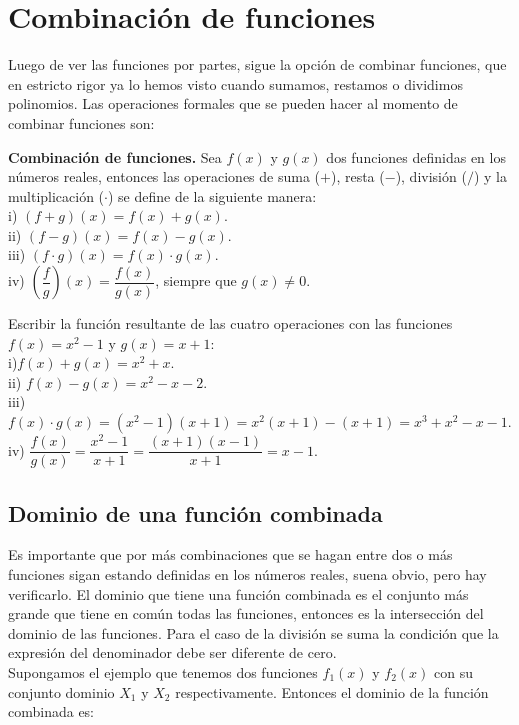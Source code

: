 \section{Combinación de funciones}
Luego de ver las funciones por partes, sigue la opción de combinar funciones, que en estricto rigor ya lo hemos visto cuando sumamos, restamos o dividimos polinomios. Las operaciones formales que se pueden hacer al momento de combinar funciones son: \\
\begin{mydef}
\textbf{Combinación de funciones.} Sea $f(x)$ y $g(x)$ dos funciones definidas en los números reales, entonces las operaciones de suma ($+$), resta ($-$), división ($\slash$) y la multiplicación ($\cdot$) se define de la siguiente manera:\\

\noindent i) $(f+g)(x)=f(x)+g(x)$.\\
\noindent ii) $(f-g)(x)=f(x)-g(x)$.\\
\noindent iii) $(f\cdot g)(x)=f(x)\cdot g(x)$.\\
\noindent iv) $\left(\dfrac{f}{g} \right)(x)=\dfrac{f(x)}{g(x)}$, siempre que $g(x)\neq 0$.\\
\end{mydef}

\begin{myexample}
Escribir la función resultante de las cuatro operaciones con las funciones $f(x)=x^{2}-1$ y $g(x)=x+1$:\\

\noindent i)$f(x)+g(x)=x^{2}+x$.\\
\noindent ii) $f(x)-g(x)=x^{2}-x-2$.\\
\noindent iii) $f(x)\cdot g(x)=(x^{2}-1)(x+1)=x^{2}(x+1)-(x+1)=x^{3}+x^{2}-x-1$.\\
\noindent iv) $\dfrac{f(x)}{g(x)}=\dfrac{x^{2}-1}{x+1}=\dfrac{(x+1)(x-1)}{x+1}=x-1$.\\
\end{myexample}

\subsection{Dominio de una función combinada}
Es importante que por más combinaciones que se hagan entre dos o más funciones sigan estando definidas en los números reales, suena obvio, pero hay verificarlo. El dominio que tiene una función combinada es el conjunto más grande que tiene en común todas las funciones, entonces es la intersección del dominio de las funciones. Para el caso de la división se suma la condición que la expresión del denominador debe ser diferente de cero.\\
 Supongamos el ejemplo que tenemos dos funciones $f_{1}(x)$ y $f_{2}(x)$ con su conjunto dominio $X_{1}$ y $X_{2}$ respectivamente. Entonces el dominio de la función combinada es: \\
 
